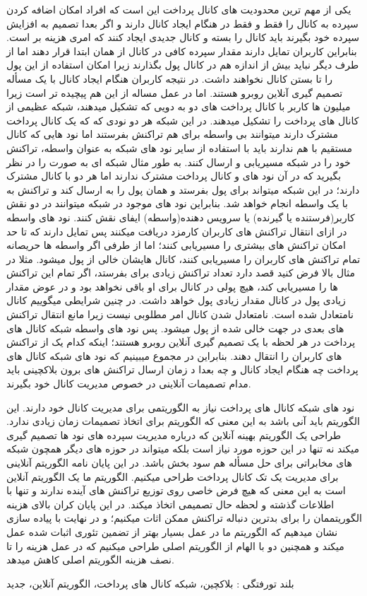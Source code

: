 یکی از مهم ترین محدودیت های کانال پرداخت این است که افراد امکان اضافه کردن سپرده به کانال را فقط و فقط در هنگام ایجاد کانال دارند و اگر بعدا تصمیم به افزایش سپرده خود بگیرند باید کانال را بسته و کانال جدیدی ایجاد کنند که امری هزینه بر است. بنابراین کاربران  تمایل دارند مقدار سپرده کافی در کانال از همان ابتدا قرار دهند اما از طرف دیگر نباید بیش از اندازه هم در کانال پول بگذارند زیرا امکان استفاده از این پول را تا بستن کانال نخواهند داشت. در نتیجه کاربران هنگام ایجاد کانال با یک مسأله تصمیم گیری آنلاین روبرو هستند. اما در عمل مساله از این هم پیچیده تر است زیرا میلیون ها کاربر با کانال پرداخت های دو به دویی که تشکیل میدهند، شبکه عظیمی از کانال های پرداخت   را تشکیل میدهند. در این شبکه هر دو نودی که که یک کانال پرداخت مشترک دارند میتوانند بی واسطه برای هم تراکنش بفرستند اما نود هایی که کانال مستقیم با هم ندارند باید با استفاده از سایر نود های شبکه به عنوان واسطه، تراکنش خود را در شبکه مسیریابی و ارسال کنند. به طور مثال شبکه ای به صورت  را در نظر بگیرید که در آن نود های  و کانال پرداخت مشترک ندارند اما هر دو با  کانال مشترک دارند؛ در این شبکه  میتواند برای  پول بفرستد و  همان پول را به  ارسال کند و تراکنش  به  با یک واسطه انجام خواهد شد. بنابراین نود های موجود در شبکه میتوانند در دو نقش کاربر(فرستنده یا گیرنده) یا سرویس دهنده(واسطه) ایفای نقش کنند. نود های واسطه در ازای انتقال تراکنش های کاربران کارمزد دریافت میکنند پس تمایل دارند که تا حد امکان تراکنش های بیشتری را مسیریابی کنند؛ اما از طرفی اگر واسطه ها حریصانه تمام تراکنش های کاربران را مسیریابی کنند، کانال هایشان خالی از پول میشود. مثلا در مثال بالا فرض کنید  قصد دارد تعداد تراکنش زیادی برای  بفرستد، اگر  تمام این تراکنش ها را مسیریابی کند، هیچ پولی در کانال   برای او باقی نخواهد بود و در عوض مقدار زیادی پول در کانال  مقدار زیادی پول خواهد داشت. در چنین شرایطی میگوییم کانال  نامتعادل شده است. نامتعادل شدن کانال امر مطلوبی نیست زیرا مانع انتقال تراکنش های بعدی در جهت خالی شده از پول میشود. پس نود های واسطه شبکه کانال های پرداخت در هر لحظه با یک تصمیم گیری آنلاین روبرو هستند؛ اینکه کدام یک از تراکنش های کاربران را انتقال دهند. بنابراین در مجموع میبینیم که نود های شبکه کانال های پرداخت چه هنگام ایجاد کانال و چه بعدا د زمان ارسال تراکنش های برون بلاکچینی باید مدام تصمیمات آنلاینی در خصوص مدیریت کانال خود بگیرند.

نود های شبکه کانال های پرداخت نیاز به الگوریتمی برای مدیریت کانال خود دارند. این الگوریتم باید آنی باشد به این معنی که الگوریتم برای اتخاذ تصمیمات زمان زیادی ندارد. طراحی یک الگوریتم بهینه آنلاین که درباره مدیریت سپرده های نود ها تصمیم گیری میکند نه تنها در این حوزه مورد نیاز است بلکه میتواند در حوزه های دیگر همچون شبکه های مخابراتی برای حل مسأله  هم سود بخش باشد. در این پایان نامه الگوریتم آنلاینی برای مدیریت یک تک کانال پرداخت طراحی میکنیم. الگوریتم ما یک الگوریتم آنلاین است به این معنی که هیچ فرض خاصی روی توزیع تراکنش های آینده ندارند و تنها با اطلاعات گذشته و لحظه حال تصمیمی اتخاذ میکند. در این پایان کران بالای هزینه الگوریتممان را برای بدترین دنباله تراکنش  ممکن اثات میکنیم؛ و در نهایت با پیاده سازی نشان میدهیم که الگوریتم ما در عمل بسیار بهتر از تضمین تئوری اثبات شده عمل میکند و همچنین دو  با الهام از الگوریتم اصلی طراحی میکنیم که در عمل هزینه را تا نصف هزینه الگوریتم اصلی کاهش میدهد.
 
‌بلند
‌تورفتگی : 
بلاکچین، شبکه کانال های پرداخت، الگوریتم آنلاین، 
‌جدید
